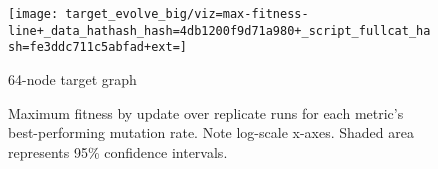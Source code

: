 \begin{figure*}
\begin{minipage}{6in}
\texttt{[image: target\_evolve\_big/viz=max-fitness-line+\_data\_hathash\_hash=4db1200f9d71a980+\_script\_fullcat\_hash=fe3ddc711c5abfad+ext=]}
\caption{64-node target graph}
\label{fig:evolve_big_bests}
\end{minipage}
\begin{minipage}{\textwidth}
\caption{
Maximum fitness by update over replicate runs for each metric's best-performing mutation rate.
Note log-scale x-axes.
Shaded area represents 95\% confidence intervals.
}
\label{fig:evolve_bests64}
\end{minipage}
\end{figure*}

